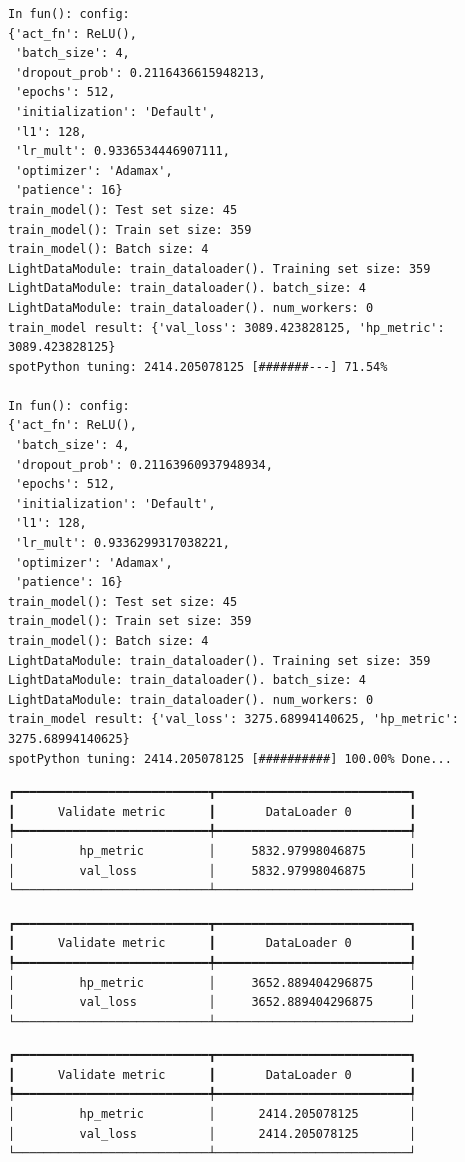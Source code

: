 \documentclass[
  letterpaper,
  DIV=11,
  numbers=noendperiod]{scrreprt}
\begin{document}
\begin{verbatim}
In fun(): config:
{'act_fn': ReLU(),
 'batch_size': 4,
 'dropout_prob': 0.2116436615948213,
 'epochs': 512,
 'initialization': 'Default',
 'l1': 128,
 'lr_mult': 0.9336534446907111,
 'optimizer': 'Adamax',
 'patience': 16}
train_model(): Test set size: 45
train_model(): Train set size: 359
train_model(): Batch size: 4
LightDataModule: train_dataloader(). Training set size: 359
LightDataModule: train_dataloader(). batch_size: 4
LightDataModule: train_dataloader(). num_workers: 0
train_model result: {'val_loss': 3089.423828125, 'hp_metric': 3089.423828125}
spotPython tuning: 2414.205078125 [#######---] 71.54% 

In fun(): config:
{'act_fn': ReLU(),
 'batch_size': 4,
 'dropout_prob': 0.21163960937948934,
 'epochs': 512,
 'initialization': 'Default',
 'l1': 128,
 'lr_mult': 0.9336299317038221,
 'optimizer': 'Adamax',
 'patience': 16}
train_model(): Test set size: 45
train_model(): Train set size: 359
train_model(): Batch size: 4
LightDataModule: train_dataloader(). Training set size: 359
LightDataModule: train_dataloader(). batch_size: 4
LightDataModule: train_dataloader(). num_workers: 0
train_model result: {'val_loss': 3275.68994140625, 'hp_metric': 3275.68994140625}
spotPython tuning: 2414.205078125 [##########] 100.00% Done...
\end{verbatim}

\begin{verbatim}
┏━━━━━━━━━━━━━━━━━━━━━━━━━━━┳━━━━━━━━━━━━━━━━━━━━━━━━━━━┓
┃      Validate metric      ┃       DataLoader 0        ┃
┡━━━━━━━━━━━━━━━━━━━━━━━━━━━╇━━━━━━━━━━━━━━━━━━━━━━━━━━━┩
│         hp_metric         │     5832.97998046875      │
│         val_loss          │     5832.97998046875      │
└───────────────────────────┴───────────────────────────┘
\end{verbatim}

\begin{verbatim}
┏━━━━━━━━━━━━━━━━━━━━━━━━━━━┳━━━━━━━━━━━━━━━━━━━━━━━━━━━┓
┃      Validate metric      ┃       DataLoader 0        ┃
┡━━━━━━━━━━━━━━━━━━━━━━━━━━━╇━━━━━━━━━━━━━━━━━━━━━━━━━━━┩
│         hp_metric         │     3652.889404296875     │
│         val_loss          │     3652.889404296875     │
└───────────────────────────┴───────────────────────────┘
\end{verbatim}

\begin{verbatim}
┏━━━━━━━━━━━━━━━━━━━━━━━━━━━┳━━━━━━━━━━━━━━━━━━━━━━━━━━━┓
┃      Validate metric      ┃       DataLoader 0        ┃
┡━━━━━━━━━━━━━━━━━━━━━━━━━━━╇━━━━━━━━━━━━━━━━━━━━━━━━━━━┩
│         hp_metric         │      2414.205078125       │
│         val_loss          │      2414.205078125       │
└───────────────────────────┴───────────────────────────┘
\end{verbatim}
\end{document}
